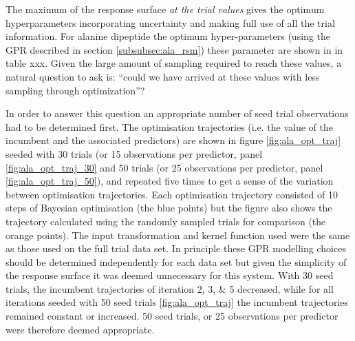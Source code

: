 The maximum of the response surface \emph{at the trial values} gives the optimum hyperparameters incorporating uncertainty and making full use of all the trial information. For alanine dipeptide the optimum hyper-parameters (using the GPR described in section \ref{subsubsec:ala_rsm}) these parameter are shown in in table xxx.  Given the large amount of sampling required to reach these values, a natural question to ask is: ``could we have arrived at these values with less sampling through optimization''? 

In order to answer this question an appropriate number of seed trial observations had to be determined first. The optimisation trajectories (i.e. the value of the incumbent and the associated predictors) are shown in figure \ref{fig:ala_opt_traj} seeded with 30 trials (or 15 observations per predictor, panel \ref{fig:ala_opt_traj_30} and 50 trials (or 25 observations per predictor, panel \ref{fig:ala_opt_traj_50}), and repeated five times to get a sense of the variation between optimisation trajectories. Each optimisation trajectory consisted of 10 steps of Bayesian optimisation (the blue points) but the figure also shows the trajectory calculated using the randomly sampled trials for comparison (the orange points). The input transformation and kernel function used were the same as those used on the full trial data set. In principle these GPR modelling choices should be determined independently for each data set but given the simplicity of the response surface it was deemed unnecessary for this system. With 30 seed trials, the incumbent trajectories of iteration 2, 3, \& 5 decreased, while for all iterations seeded with 50 seed trials \ref{fig:ala_opt_traj} the incumbent trajectories remained constant or increased. 50 seed trials, or 25 observations per predictor were therefore deemed appropriate. 

